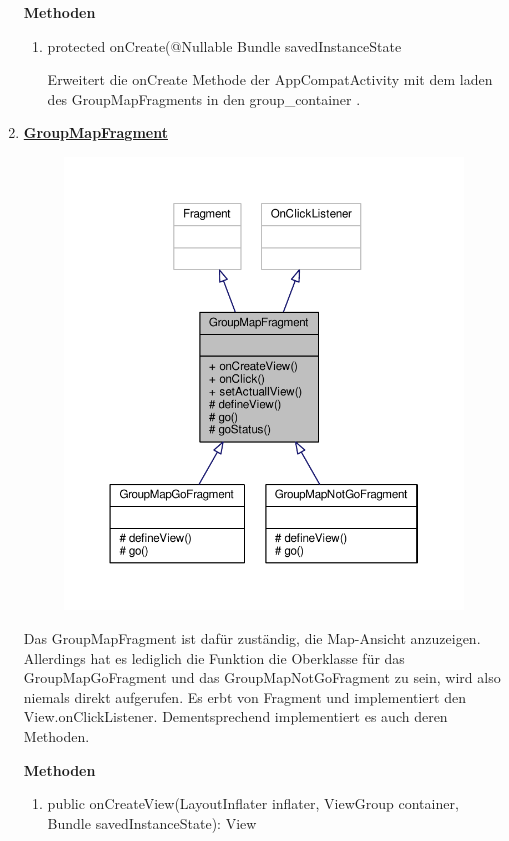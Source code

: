 \begin{enumerate}
	\textbf{Methoden}
	
	\begin{enumerate}
		\item protected onCreate(@Nullable Bundle savedInstanceState

		Erweitert die onCreate Methode der AppCompatActivity mit dem laden des GroupMapFragments in den group\_container .
	\end{enumerate}
	
	\item \textbf{\underline{GroupMapFragment}}

	\begin{figure}[H]
		\includegraphics[scale = 1]{res/group_map_fragment__inherit__graph.pdf}
		\centering
	\end{figure}
	Das GroupMapFragment ist dafür zuständig, die Map-Ansicht anzuzeigen. Allerdings hat es lediglich die Funktion die Oberklasse für das GroupMapGoFragment und das GroupMapNotGoFragment zu sein, wird also niemals direkt aufgerufen. Es erbt von Fragment und implementiert den View.onClickListener. Dementsprechend implementiert es auch deren Methoden.
	
	\textbf{Methoden}	
	\begin{enumerate}
		\item public onCreateView(LayoutInflater inflater, ViewGroup container, Bundle savedInstanceState): View
		

\end{enumerate}
\end{enumerate}

